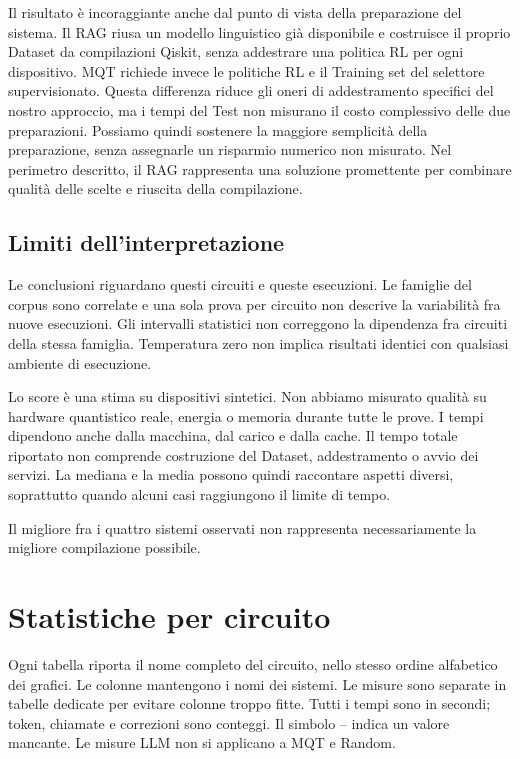 Il risultato è incoraggiante anche dal punto di vista della preparazione del sistema. Il RAG riusa un modello linguistico già disponibile e costruisce il proprio Dataset da compilazioni Qiskit, senza addestrare una politica RL per ogni dispositivo. MQT richiede invece le politiche RL e il Training set del selettore supervisionato. Questa differenza riduce gli oneri di addestramento specifici del nostro approccio, ma i tempi del Test non misurano il costo complessivo delle due preparazioni. Possiamo quindi sostenere la maggiore semplicità della preparazione, senza assegnarle un risparmio numerico non misurato. Nel perimetro descritto, il RAG rappresenta una soluzione promettente per combinare qualità delle scelte e riuscita della compilazione.
\clearpage\subsection{Limiti dell'interpretazione}
Le conclusioni riguardano questi circuiti e queste esecuzioni. Le famiglie
del corpus sono correlate e una sola prova per circuito non descrive la
variabilità fra nuove esecuzioni. Gli intervalli statistici non correggono
la dipendenza fra circuiti della stessa famiglia. Temperatura zero non implica
risultati identici con qualsiasi ambiente di esecuzione.

Lo score è una stima su dispositivi sintetici. Non abbiamo misurato qualità
su hardware quantistico reale, energia o memoria durante tutte le prove.
I tempi dipendono anche dalla macchina, dal carico e dalla cache.
Il tempo totale riportato non comprende costruzione del Dataset,
addestramento o avvio dei servizi. La mediana e la media possono quindi
raccontare aspetti diversi, soprattutto quando alcuni casi raggiungono il
limite di tempo.

Il migliore fra i quattro sistemi osservati non rappresenta
necessariamente la migliore compilazione possibile.

\clearpage\appendix\section{Statistiche per circuito}
Ogni tabella riporta il nome completo del circuito, nello stesso ordine alfabetico dei grafici. Le colonne mantengono i nomi dei sistemi. Le misure sono separate in tabelle dedicate per evitare colonne troppo fitte. Tutti i tempi sono in secondi; token, chiamate e correzioni sono conteggi. Il simbolo -- indica un valore mancante. Le misure LLM non si applicano a MQT e Random.

